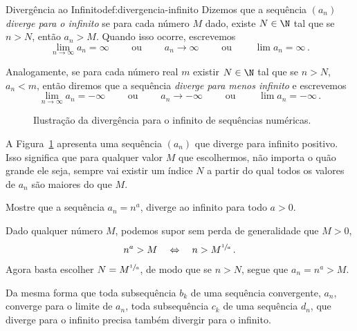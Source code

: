 \begin{definicao}{Divergência ao Infinito}{def:divergencia-infinito}
  Dizemos que a sequência $(a_n)$ \emph{diverge para o infinito}
  se para cada número $M$ dado,
  existe $N\in\N$ tal que se $n>N$, então $a_n>M$.
  Quando isso ocorre, escrevemos
  \[ \lim_{n\to\infty} a_n=\infty
  \qquad\text{ ou }\qquad
  a_n\to \infty
  \qquad\text{ ou }\qquad
  \lim a_n=\infty   \,.
  \]

  Analogamente, se para cada número real $m$ existir $N\in \N$ tal que se $n>N$, $a_n<m$,
  então diremos que a sequência \emph{diverge para menos infinito} e escrevemos
  \[
  \lim_{n\to\infty} a_n=-\infty
  \qquad\text{ ou }\qquad
  a_n\to-\infty
  \qquad\text{ ou }\qquad
  \lim a_n=-\infty \,.
  \]
\end{definicao}

\begin{figure}
  \centering
  \vspace{0.5\baselineskip}
  
  \caption{Ilustração da divergência para o infinito de sequências numéricas.}
  \label{fig:sequencia_infinity}
\end{figure}

A Figura~\ref{fig:sequencia_infinity} apresenta uma sequência $(a_n)$ que
diverge para infinito positivo. Isso significa que para qualquer valor $M$
que escolhermos, não importa o quão grande ele seja, sempre vai existir um
índice $N$ a partir do qual todos os valores de $a_n$ são maiores do que $M$.

\begin{example}
  Mostre que a sequência $a_n=n^a$, diverge ao infinito para todo $a>0$.

  \solution
  Dado qualquer número $M$, podemos supor sem perda de generalidade que $M>0$,
  \[
  n^a > M \quad \Leftrightarrow \quad n > M^{\sfrac{1}{a}}  \,.
  \]
  Agora basta escolher $N=M^{\sfrac{1}{a}}$, de modo que se $n>N$, segue que $a_n=n^a>M$.
\end{example}

Da mesma forma que toda subsequência $b_k$ de uma sequência convergente, $a_n$,
converge para o limite de $a_n$, toda subsequência $c_k$ de uma sequência $d_n$, que
diverge para o infinito precisa também divergir para o infinito.

